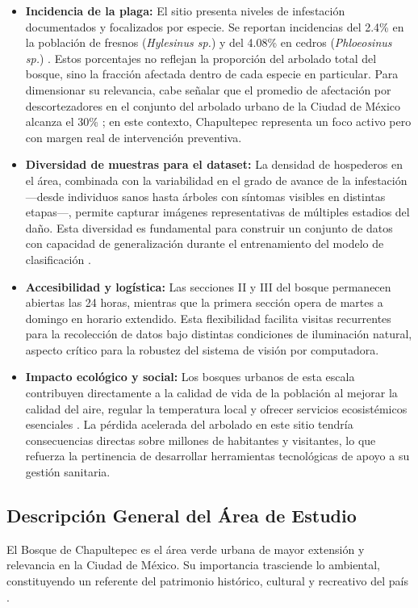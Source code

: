 \begin{itemize}
    \item \textbf{Incidencia de la plaga:} El sitio presenta niveles de infestación documentados y focalizados por especie. Se reportan incidencias del 2.4\% en la población de fresnos (\textit{Hylesinus sp.}) y del 4.08\% en cedros (\textit{Phloeosinus sp.}) \cite{resendiz2019salud}. Estos porcentajes no reflejan la proporción del arbolado total del bosque, sino la fracción afectada 
    dentro de cada especie en particular. Para dimensionar su relevancia, cabe señalar que el promedio de afectación por descortezadores en el conjunto del arbolado urbano de la Ciudad de México alcanza el 30\% \cite{vega2022mongabay}; en este contexto, Chapultepec representa un foco activo pero con margen real de intervención preventiva.

    \item \textbf{Diversidad de muestras para el dataset:} La densidad de hospederos en el área, combinada con la variabilidad en el grado de avance de la infestación —desde individuos sanos hasta árboles con síntomas visibles en distintas etapas—, permite capturar imágenes representativas de múltiples estadios del daño. Esta diversidad es fundamental para construir un conjunto de datos con capacidad de generalización durante el entrenamiento del modelo de 
    clasificación \cite{resendiz2019salud}.

    \item \textbf{Accesibilidad y logística:} Las secciones II y III del bosque permanecen abiertas las 24 horas, mientras que la primera sección opera de martes a domingo en horario extendido. Esta flexibilidad facilita visitas recurrentes para la recolección de datos bajo distintas condiciones de iluminación natural, aspecto crítico para la robustez del sistema de visión por computadora.

    \item \textbf{Impacto ecológico y social:} Los bosques urbanos de esta escala contribuyen directamente a la calidad de vida de la población al mejorar la calidad del aire, regular la temperatura local y ofrecer servicios ecosistémicos esenciales \cite{forestal2025bosques}. La pérdida acelerada del arbolado en este sitio tendría consecuencias directas sobre millones de habitantes y visitantes, lo que refuerza la pertinencia de desarrollar herramientas tecnológicas de apoyo a su gestión sanitaria.
\end{itemize}

\subsection{Descripción General del Área de Estudio}
El Bosque de Chapultepec es el área verde urbana de mayor extensión y relevancia en la Ciudad de México. Su importancia trasciende lo ambiental, constituyendo un referente del patrimonio histórico, cultural y recreativo del país 
\cite{mora2022chapultepec}.

